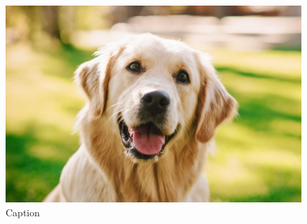 \documentclass[10pt]{article}
\begin{document}
\begin{figure}
    \centering
    \includegraphics[width=0.5\linewidth]{perro.jpg}
    \caption{Caption}
    \label{fig:enter-label}
\end{figure}
\end{document}
